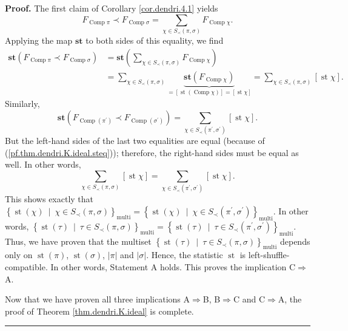 \documentclass[numbers=enddot,12pt,final,onecolumn,notitlepage]{scrartcl}%
\theoremstyle{definition}
\newenvironment{proof}[1][Proof]{\noindent\textbf{#1.} }{\ \rule{0.5em}{0.5em}}
\let\sumnonlimits\sum
\renewcommand{\sum}{\sumnonlimits\limits}
\begin{document}
\begin{proof}
The first claim of Corollary \ref{cor.dendri.4.1} yields%
\[
F_{\operatorname*{Comp}\pi}\left.  \prec\right.  F_{\operatorname*{Comp}%
\sigma}=\sum_{\chi\in S_{\prec}\left(  \pi,\sigma\right)  }%
F_{\operatorname*{Comp}\chi}.
\]
Applying the map $\mathbf{st}$ to both sides of this equality, we find%
\begin{align*}
\mathbf{st}\left(  F_{\operatorname*{Comp}\pi}\left.  \prec\right.
F_{\operatorname*{Comp}\sigma}\right)   &  =\mathbf{st}\left(  \sum_{\chi\in
S_{\prec}\left(  \pi,\sigma\right)  }F_{\operatorname*{Comp}\chi}\right) \\
&  =\sum_{\chi\in S_{\prec}\left(  \pi,\sigma\right)  }\underbrace{\mathbf{st}%
\left(  F_{\operatorname*{Comp}\chi}\right)  }_{=\left[  \operatorname*{st}%
\left(  \operatorname*{Comp}\chi\right)  \right]  =\left[  \operatorname*{st}%
\chi\right]  }=\sum_{\chi\in S_{\prec}\left(  \pi,\sigma\right)  }\left[
\operatorname*{st}\chi\right]  .
\end{align*}
Similarly,%
\[
\mathbf{st}\left(  F_{\operatorname*{Comp}\left(  \pi^{\prime}\right)
}\left.  \prec\right.  F_{\operatorname*{Comp}\left(  \sigma^{\prime}\right)
}\right)  =\sum_{\chi\in S_{\prec}\left(  \pi^{\prime},\sigma^{\prime}\right)
}\left[  \operatorname*{st}\chi\right]  .
\]
But the left-hand sides of the last two equalities are equal (because of
(\ref{pf.thm.dendri.K.ideal.steq})); therefore, the right-hand sides must be
equal as well. In other words,
\[
\sum_{\chi\in S_{\prec}\left(  \pi,\sigma\right)  }\left[  \operatorname*{st}%
\chi\right]  =\sum_{\chi\in S_{\prec}\left(  \pi^{\prime},\sigma^{\prime
}\right)  }\left[  \operatorname*{st}\chi\right]  .
\]
This shows exactly that $\left\{  \operatorname*{st}\left(  \chi\right)
\ \mid\ \chi\in S_{\prec}\left(  \pi,\sigma\right)  \right\}
_{\operatorname*{multi}} =\left\{  \operatorname*{st}\left(  \chi\right)
\ \mid\ \chi\in S_{\prec}\left(  \pi^{\prime},\sigma^{\prime}\right)
\right\}  _{\operatorname*{multi}} $. In other words, $\left\{
\operatorname*{st}\left(  \tau\right)  \ \mid\ \tau\in S_{\prec}\left(
\pi,\sigma\right)  \right\}  _{\operatorname*{multi}} =\left\{
\operatorname*{st}\left(  \tau\right)  \ \mid\ \tau\in S_{\prec}\left(
\pi^{\prime},\sigma^{\prime}\right)  \right\}  _{\operatorname*{multi}} $.
Thus, we have proven that the multiset $\left\{  \operatorname*{st}\left(
\tau\right)  \ \mid\ \tau\in S_{\prec}\left(  \pi,\sigma\right)  \right\}
_{\operatorname*{multi}} $ depends only on $\operatorname*{st}\left(
\pi\right)  $, $\operatorname*{st}\left(  \sigma\right)  $, $\left\vert
\pi\right\vert $ and $\left\vert \sigma\right\vert $. Hence, the statistic
$\operatorname*{st}$ is left-shuffle-compatible. In other words, Statement A
holds. This proves the implication C$\Longrightarrow$A.

Now that we have proven all three implications A$\Longrightarrow$B,
B$\Longrightarrow$C and C$\Longrightarrow$A, the proof of Theorem
\ref{thm.dendri.K.ideal} is complete.
\end{proof}
\end{document}
